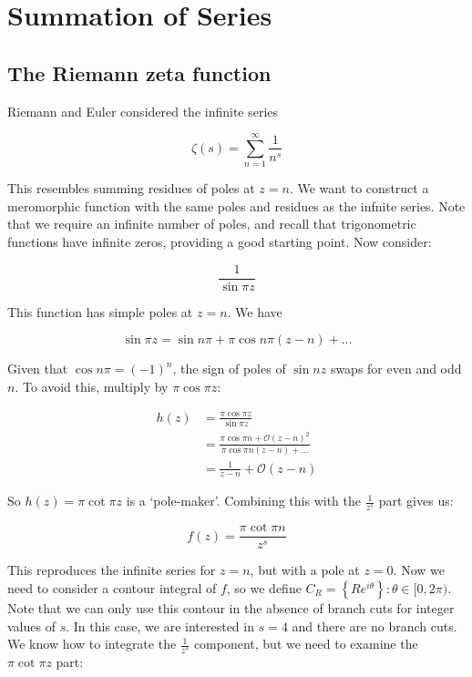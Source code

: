 \documentclass{../../physics_notes}
\begin{document}
\section{Summation of Series}

\subsection{The Riemann zeta function}

Riemann and Euler considered the infinite series

\begin{equation}\label{eq:riemann_zeta}
\zeta(s) = \sum_{n=1}^\infty \frac{1}{n^s}
\end{equation}

This resembles summing residues of poles at $z=n$. We want to construct a meromorphic function with the same poles and residues as the infnite series. Note that we require an infinite number of poles, and recall that trigonometric functions have infinite zeros, providing a good starting point. Now consider:

\[ \frac{1}{\sin{\pi z}} \]

This function has simple poles at $z=n$. We have 

\[ \sin{\pi z} = \sin{n\pi} + \pi\cos{n\pi}(z-n) + ... \]

Given that $\cos{n\pi} = (-1)^n$, the sign of poles of $\sin{nz}$ swaps for even and odd $n$. To avoid this, multiply by $\pi \cos{\pi z}$:

\begin{align*}
h(z) &= \frac{\pi\cos{\pi z}}{\sin{\pi z}} \\
&= \frac{\pi\cos{\pi n} + \mathcal{O}(z-n)^2}{\pi\cos{\pi n} (z-n) + \dots} \\
&= \frac{1}{z-n} + \mathcal{O}(z-n)
\end{align*}

So $h(z) = \pi\cot{\pi z}$ is a `pole-maker'. Combining this with the $\frac{1}{z^s}$ part gives us:

\[ f(z) = \frac{\pi\cot{\pi n}}{z^s} \]

This reproduces the infinite series for $z = n$, but with a pole at $z=0$. Now we need to consider a contour integral of $f$, so we define $C_R = \left\{Re^{i\theta}\right\}: \theta \in [0,2\pi)$. Note that we can only use this contour in the absence of branch cuts for integer values of $s$. In this case, we are interested in $s=4$ and there are no branch cuts. We know how to integrate the $\frac{1}{z^s}$ component, but we need to examine the $\pi\cot{\pi z}$ part:
\end{document}
